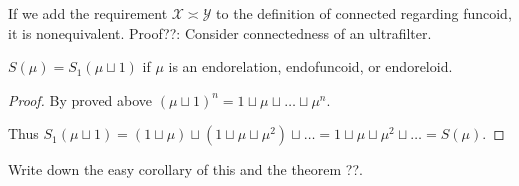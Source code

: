 If we add the requirement $\mathcal{X} \asymp \mathcal{Y}$ to the definition
of connected regarding funcoid, it is nonequivalent. Proof??: Consider
connectedness of an ultrafilter.

\begin{prop}
  $S (\mu) = S_1 (\mu \sqcup 1)$ if $\mu$ is an endorelation, endofuncoid, or
  endoreloid. 
\end{prop}

\begin{proof}
  By proved above $(\mu \sqcup 1)^n = 1 \sqcup \mu \sqcup \ldots \sqcup
  \mu^n$.

  Thus $S_1 (\mu \sqcup 1) = (1 \sqcup \mu) \sqcup (1 \sqcup \mu \sqcup \mu^2)
  \sqcup \ldots = 1 \sqcup \mu \sqcup \mu^2 \sqcup \ldots = S (\mu)$.
\end{proof}

\begin{xca}
  Write down the easy corollary of this and the theorem ??.
\end{xca}

